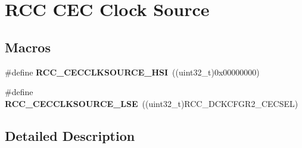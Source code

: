 \hypertarget{group___r_c_c_ex___c_e_c___clock___source}{}\section{R\+CC C\+EC Clock Source}
\label{group___r_c_c_ex___c_e_c___clock___source}
\subsection*{Macros}
\begin{DoxyCompactItemize}
\item 
\#define {\bfseries R\+C\+C\+\_\+\+C\+E\+C\+C\+L\+K\+S\+O\+U\+R\+C\+E\+\_\+\+H\+SI}~((uint32\+\_\+t)0x00000000)\hypertarget{group___r_c_c_ex___c_e_c___clock___source_ga0b52eebb2bb87574a7cfba782e59b482}{}\label{group___r_c_c_ex___c_e_c___clock___source_ga0b52eebb2bb87574a7cfba782e59b482}

\item 
\#define {\bfseries R\+C\+C\+\_\+\+C\+E\+C\+C\+L\+K\+S\+O\+U\+R\+C\+E\+\_\+\+L\+SE}~((uint32\+\_\+t)R\+C\+C\+\_\+\+D\+C\+K\+C\+F\+G\+R2\+\_\+\+C\+E\+C\+S\+EL)\hypertarget{group___r_c_c_ex___c_e_c___clock___source_ga0ce76c7cbd6575550c7dc4d9397d934a}{}\label{group___r_c_c_ex___c_e_c___clock___source_ga0ce76c7cbd6575550c7dc4d9397d934a}

\end{DoxyCompactItemize}


\subsection{Detailed Description}
